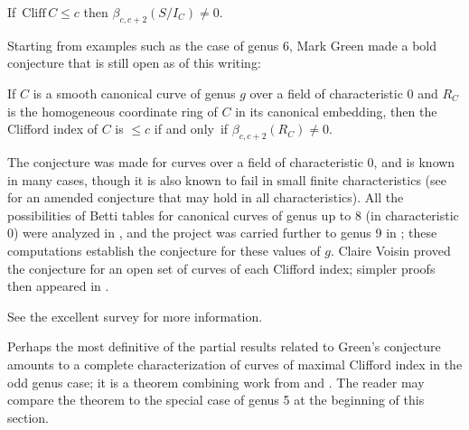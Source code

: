 \begin{corollary}
If\, $\mathrm{Cliff}\, C \leq c$ then $\beta_{c,c+2}(S/I_C) \neq 0$.
\unif
\end{corollary}

Starting from examples such as the case of genus 6, Mark Green made a
%
bold conjecture that is still open as of this writing:

\begin{conjecture}
If $C$ is a smooth canonical curve of genus $g$ over a field of 
characteristic 0
 and $R_{C}$ is the
%
homogeneous coordinate ring of $C$ in its canonical embedding,
then the Clifford index of $C$ is $\leq c$ if and only~if
$\beta_{c,c+2}(R_{C}) \neq 0$.
\unif
\end{conjecture}

The conjecture was made for curves over a field of characteristic 0, and
is known in many cases, though it is also known to fail in small finite
characteristics (see \cite{Bopp-Schreyer} for an amended conjecture that
%
%
may hold in all characteristics).
All the possibilities of Betti tables for
canonical curves of genus up to 8 (in characteristic 0) were
analyzed
in \cite{Schreyer-canonical},
and the project was carried further to
genus 9 in \cite{Sagraloff}; 
these computations
establish the conjecture for these values of $g$.
Claire Voisin
\citeyear{MR1941089,MR2157134} 
%
proved
the conjecture 
for an open set of curves of each Clifford index; 
simpler proofs then appeared in
\cite{MR4022070,MR4213770,arXiv:2205.00266}.

See the excellent survey \cite{Farkas-progress-on-syzygies}
for more information.

Perhaps the most definitive of the 
partial results related to Green's conjecture
amounts to a complete characterization of curves
of maximal Clifford index in the odd genus case; it 
is a theorem combining work from \cite{MR1603255} and \cite{MR2157134}.
The reader may compare the theorem to the special case of genus 5 at the 
beginning of this section.

